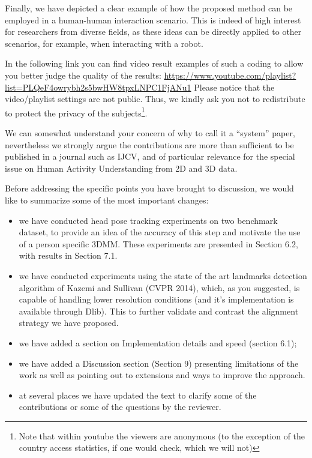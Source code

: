 {\vspace*{1mm}

Finally, we have depicted a clear example of how the proposed method can be employed in a human-human interaction
scenario. This is indeed of high interest for researchers from diverse fields, as these ideas can be directly applied
to other scenarios, for example, when interacting with a robot.
%

In the following link you can find video result examples of such a coding to allow you better judge the quality of the results:
\newline
\newline
\url{https://www.youtube.com/playlist?list=PLQeF4owrybh2s5bwHW8tpxLNPC1FjANu1}
\newline
\newline
Please notice that the video/playlist settings are not public. Thus, we kindly ask you not to redistribute to protect the privacy of the subjects\footnote{Note that within youtube the viewers are anonymous (to the exception of the country access statistics, if one would check, which we will not)}.

\vspace*{1mm}


We can somewhat understand your concern of why to call it a ``system'' paper, nevertheless we strongly argue the contributions
are more than sufficient to be published in a journal such as IJCV, and of particular relevance for the special issue
on Human Activity Understanding from 2D and 3D data.

\vspace*{1mm}


Before addressing the specific points you have brought to discussion, we would like to summarize some of the most important changes:
\begin{itemize}
\item we have conducted head pose tracking experiments on two benchmark dataset, to provide an idea of the accuracy of this step 
  and motivate the use of a person specific 3DMM. These experiments are presented in Section 6.2, with results in Section 7.1.
\item we have conducted experiments using the state of the art landmarks detection algorithm of Kazemi and Sullivan (CVPR 2014), which, as
you suggested, is capable of handling lower resolution conditions (and it's implementation is available through Dlib). This to
further validate and contrast the alignment strategy we have proposed.
%
\item we have added a section on Implementation details and speed (section 6.1);
\item we have added a Discussion section (Section 9) presenting limitations of the work as well as pointing out to extensions and ways to improve the approach.
\item at several places we have updated the text to clarify some of the contributions or some of the questions by the reviewer.
\end{itemize}

}

